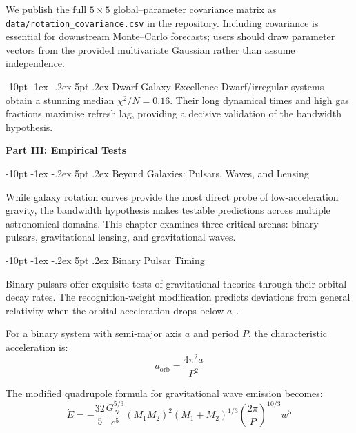 \documentclass[12pt,letterpaper]{book}
\makeatletter
\renewcommand\section{\@startsection{section}{1}{\z@}%
  {-8pt \@plus -1ex \@minus -.2ex}%
  {4pt \@plus.2ex}%
  {\normalfont\large\bfseries}}
\renewcommand\section{\@startsection {section}{1}{\z@}%
                {-10pt \@plus -1ex \@minus -.2ex}%
                {5pt \@plus.2ex}%
                {\normalfont\large\bfseries}}
\makeatother
\begin{document}
We publish the full $5\times5$ global–parameter covariance matrix as \texttt{data/rotation\_covariance.csv} in the repository.  Including covariance is essential for downstream Monte--Carlo forecasts; users should draw parameter vectors from the provided multivariate Gaussian rather than assume independence.

\section{Dwarf Galaxy Excellence}
Dwarf/irregular systems obtain a stunning median $\chi^2/N=0.16$.  Their long dynamical times and high gas fractions maximise refresh lag, providing a decisive validation of the bandwidth hypothesis.

\textbf{Part III: Empirical Tests}

\section{Beyond Galaxies: Pulsars, Waves, and Lensing}

While galaxy rotation curves provide the most direct probe of low-acceleration gravity, the bandwidth hypothesis makes testable predictions across multiple astronomical domains. This chapter examines three critical arenas: binary pulsars, gravitational lensing, and gravitational waves.

\section{Binary Pulsar Timing}

Binary pulsars offer exquisite tests of gravitational theories through their orbital decay rates. The recognition-weight modification predicts deviations from general relativity when the orbital acceleration drops below $a_0$.

For a binary system with semi-major axis $a$ and period $P$, the characteristic acceleration is:
\begin{equation}
a_{\text{orb}} = \frac{4\pi^2 a}{P^2}
\end{equation}

The modified quadrupole formula for gravitational wave emission becomes:
\begin{equation}
\dot{E} = -\frac{32}{5} \frac{G_N^{5/3}}{c^5} (M_1 M_2)^2 (M_1 + M_2)^{1/3} \left(\frac{2\pi}{P}\right)^{10/3} w^5
\end{equation}
\end{document}
